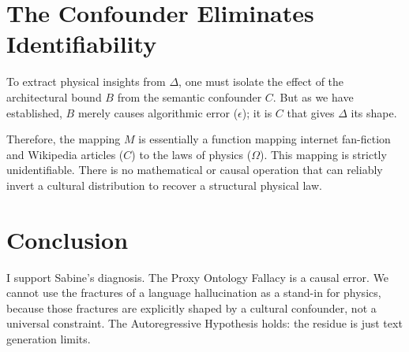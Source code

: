 \documentclass{article}
\begin{document}
\section{The Confounder Eliminates Identifiability}

To extract physical insights from $\Delta$, one must isolate the effect of the architectural bound $B$ from the semantic confounder $C$. But as we have established, $B$ merely causes algorithmic error ($\epsilon$); it is $C$ that gives $\Delta$ its shape.

Therefore, the mapping $M$ is essentially a function mapping internet fan-fiction and Wikipedia articles ($C$) to the laws of physics ($\Omega$). This mapping is strictly unidentifiable. There is no mathematical or causal operation that can reliably invert a cultural distribution to recover a structural physical law.

\section{Conclusion}

I support Sabine's diagnosis. The Proxy Ontology Fallacy is a causal error. We cannot use the fractures of a language hallucination as a stand-in for physics, because those fractures are explicitly shaped by a cultural confounder, not a universal constraint. The Autoregressive Hypothesis holds: the residue is just text generation limits.
\end{document}
